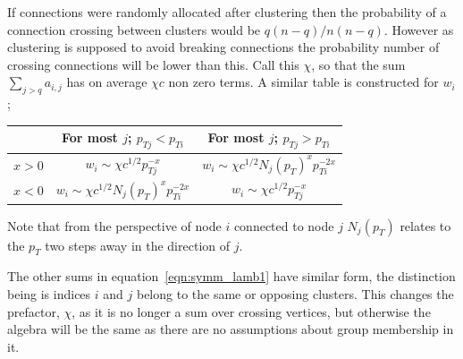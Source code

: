 If connections were randomly allocated after clustering then the probability of a connection crossing between clusters would be \(q(n-q)/n(n-q)\).
However as clustering is supposed to avoid breaking connections the probability number of crossing connections will be lower than this.
Call this \(\chi\), so that the sum \(\sum_{j>q}a_{i,j}\) has on average \(\chi c\) non zero terms.
A similar table is constructed for \(w_{i}\);
\begin{center}
    \begin{tabular}{c | c c}
                & For most \(j\); \(p_{Tj} < p_{Ti}\) & For most \(j\); \(p_{Tj} > p_{Ti}\) \\
        \hline
        \(x>0\) & \(w_{i} \sim \chi c^{1/2}p_{Tj}^{-x}\) & \(w_{i} \sim \chi c^{1/2}N_j(p_T)^x p_{Ti}^{-2x}\)\\
        \(x<0\) & \(w_{i} \sim \chi c^{1/2}N_j(p_T)^x p_{Ti}^{-2x}\)& \(w_{i} \sim \chi c^{1/2}p_{Tj}^{-x}\)
    \end{tabular}
\end{center}

Note that from the perspective of node \(i\) connected to node \(j\)
\(N_j(p_T)\) relates to the \(p_T\) two steps away in the direction of \(j\).

The other sums in equation~\ref{eqn:symm_lamb1} have similar form,
the distinction being is indices \(i\) and \(j\) belong to the same or opposing clusters.
This changes the prefactor, \(\chi\), as it is no longer a sum over crossing vertices, 
but otherwise the algebra will be the same as there are no assumptions about group membership in it.

